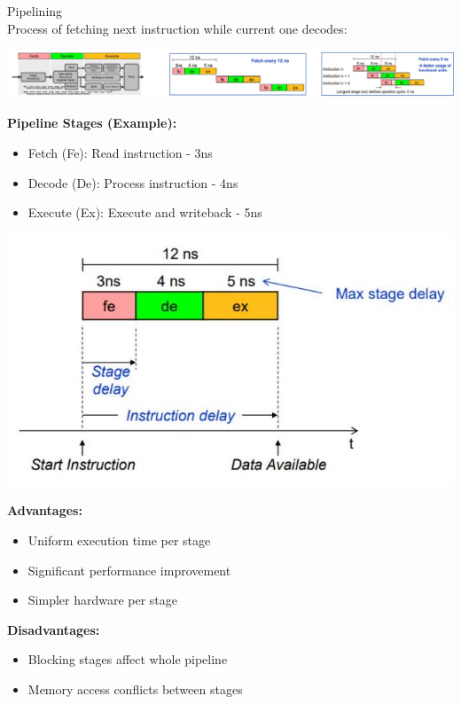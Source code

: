 \begin{concept}{Pipelining}\\
Process of fetching next instruction while current one decodes:

\includegraphics[width=\linewidth]{images/2024_12_29_79e6b22f503fb7b4f718g-14(2)}

\textbf{Pipeline Stages (Example):}
\begin{itemize}
  \item Fetch (Fe): Read instruction - 3ns
  \item Decode (De): Process instruction - 4ns
  \item Execute (Ex): Execute and writeback - 5ns
\end{itemize}

\includegraphics[width=\linewidth]{images/2024_12_29_79e6b22f503fb7b4f718g-14(1)}

\textbf{Advantages:}
\begin{itemize}
  \item Uniform execution time per stage
  \item Significant performance improvement
  \item Simpler hardware per stage
\end{itemize}

\textbf{Disadvantages:}
\begin{itemize}
  \item Blocking stages affect whole pipeline
  \item Memory access conflicts between stages
\end{itemize}
\end{concept}

